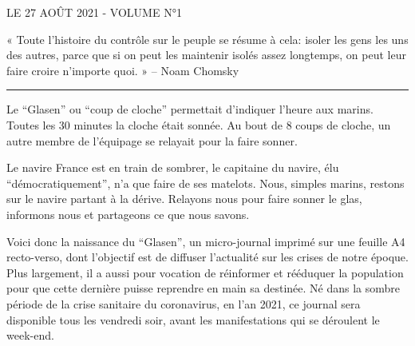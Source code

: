 \documentclass[a4paper]{article}
\date{Le vendredi 27 août 2021}
\begin{document}

\begin{multicols}{3}

  {}\hfill
  
  \vspace*{0.1in}
  \begin{center}
    \MakeUppercase{\small Le 27 août 2021 - Volume n°1 }\hfill \\
    \vspace*{0.2in}

    \begin{minipage}{5cm}
    \noindent « Toute l'histoire du contrôle sur le peuple se résume à cela:
    isoler les gens les uns des autres, parce que si on peut les maintenir
    isolés assez longtemps, on peut leur faire croire n'importe
    quoi. »  -- Noam Chomsky
    \vspace*{0.2in}
    \end{minipage}
    
    \vspace*{-16pt}
    \rule[1pt]{\hsize}{1pt}
  \end{center}

Le ``Glasen'' ou ``coup de cloche'' permettait d'indiquer l'heure aux
marins.  Toutes les 30 minutes la cloche était sonnée. Au bout de 8
coups de cloche, un autre membre de l'équipage se relayait pour la
faire sonner.

Le navire France est en train de sombrer, le capitaine du navire, élu
``démocratiquement'', n'a que faire de ses matelots. Nous, simples
marins, restons sur le navire partant à la dérive. Relayons nous pour
faire sonner le glas, informons nous et partageons ce que nous savons.

Voici donc la naissance du ``Glasen'', un micro-journal imprimé sur
une feuille A4 recto-verso, dont l'objectif est de diffuser
l'actualité sur les crises de notre époque. Plus largement, il a aussi
pour vocation de réinformer et rééduquer la population pour que cette
dernière puisse reprendre en main sa destinée. Né dans la sombre
période de la crise sanitaire du coronavirus, en l'an 2021, ce journal
sera disponible tous les vendredi soir, avant les manifestations qui
se déroulent le week-end.


\end{multicols}
\end{document}
